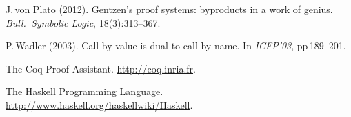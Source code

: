 \documentclass[11pt,twocolumn]{article}
\begin{document}
{\begin{thebibliography}{000}
J.\,von Plato (2012).
\newblock Gentzen's proof systems: byproducts in a work of genius.
\newblock \emph{Bull.\ Symbolic Logic}, 18(3):313--367.


P.\,Wadler (2003).
\newblock Call-by-value is dual to call-by-name.
\newblock In \emph{ICFP'03}, pp\,189--201.

The Coq Proof Assistant.
\newblock \url{http://coq.inria.fr}.

The Haskell Programming Language.
\newblock \url{http://www.haskell.org/haskellwiki/Haskell}.
\end{thebibliography}
}
  
%
\end{document}
